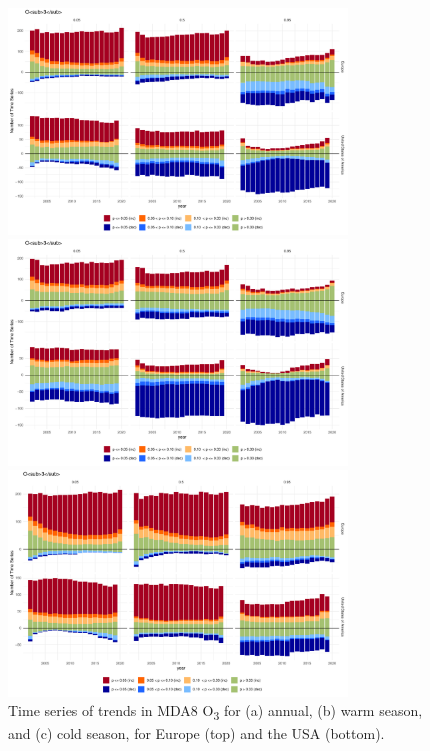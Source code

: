 \documentclass[journal abbreviation, manuscript]{copernicus}
\begin{document}
\begin{figure}[h!]
\centering
\includegraphics[width=9cm]{test_figures/significance_bars_freeTau_mda8_anom_all.pdf}

\vspace{1em}

\includegraphics[width=9cm]{test_figures/significance_bars_freeTau_mda8_anom_warm.pdf}

\vspace{1em}

\includegraphics[width=9cm]{test_figures/significance_bars_freeTau_mda8_anom_cold.pdf}

\caption{Time series of trends in MDA8 O\textsubscript{3} for (a) annual, (b) warm season, and (c) cold season, for Europe (top) and the USA (bottom).}
\label{fig:p_bar_year_mda8_anom_combined}
\end{figure}
\end{document}
